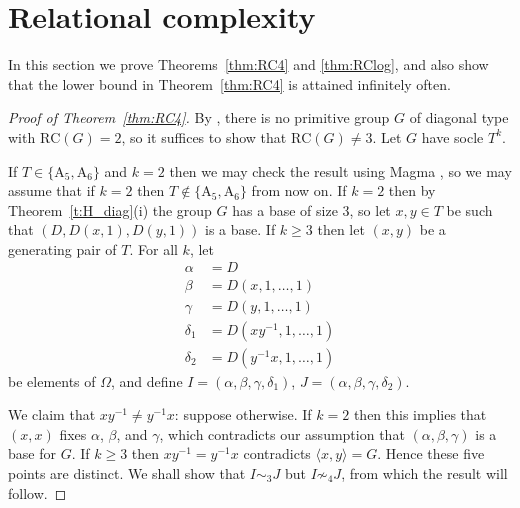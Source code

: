 \documentclass[twoside,a4paper,reqno,11pt]{amsart}
\newcommand{\<}{\langle}
\renewcommand{\>}{\rangle}
\newcommand{\geqs}{\geqslant}
\newcommand{\An}{\mathrm{A}}
\theoremstyle{definition}
\begin{document}
\section{Relational complexity}\label{sec:RC}

In this section we prove Theorems~\ref{thm:RC4} and \ref{thm:RClog}, and also show that the lower bound in Theorem~\ref{thm:RC4} is attained infinitely often.


\begin{proof}[Proof of Theorem~\ref{thm:RC4}]
	By \cite[Corollary 1.4]{GLS_binary}, there is no primitive group $G$ of diagonal type with $\mathrm{RC}(G) = 2$, so it suffices to show that $\mathrm{RC}(G)\ne 3$. Let $G$ have socle $T^k$.
    
     If $T\in\{ \An_5, \An_6\}$ and $k = 2$ then we may check the result using {\sc Magma} \cite{MAGMA}, 
    so we may assume that if $k = 2$ then $T\notin\{ \An_5, \An_6\}$ from now on. If $k = 2$ then by Theorem~\ref{t:H_diag}(i) the group $G$ has a base of size $3$, so let $x, y \in T$ be such that
    $(D,D(x,1),D(y,1))$ is a base. 
     If $k \geqs 3$ then let $(x,y)$ be a generating pair of $T$. For all $k$, let
	\begin{equation*}%
	\begin{aligned}
	\alpha &= D\\
	\beta &= D(x,1,\dots,1)\\
	\gamma &= D(y,1,\dots,1)\\
	\delta_1 &= D(xy^{-1},1,\dots,1)\\
	\delta_2 &= D(y^{-1}x,1,\dots,1)
	\end{aligned}
	\end{equation*}
    be elements of $\Omega$, and define $I = (\alpha,\beta,\gamma,\delta_1)$, $J = (\alpha,\beta,\gamma,\delta_2)$. 
    
    We claim that $xy^{-1} \neq  y^{-1}x$: suppose otherwise. If $k = 2$ then this implies that $(x,x)$ fixes $\alpha$, $\beta$, and $\gamma$, which contradicts our assumption that $(\alpha,\beta,\gamma)$ is a base for $G$. If $k \geqs 3$ then $xy^{-1} = y^{-1}x$ contradicts $\langle x, y \rangle = G$. 
    Hence these five points are %
    distinct. We shall show that $I \sim_3 J$ but $I \not\sim_4 J$, from which the result will follow. 


\end{proof}
\end{document}
